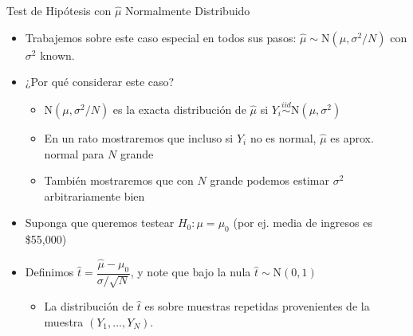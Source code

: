 \documentclass[11pt,handout,aspectratio=169]{beamer}
\begin{document}
\begin{frame}{Test de Hipótesis con $\hat\mu$ Normalmente Distribuido }
\begin{itemize}
	\item 
	Trabajemos sobre este caso especial en todos sus pasos: $\hat\mu \sim \mathrm{N}(\mu, \sigma^2/N)$ con $\sigma^2$ known. 
	\medskip
	\pause
	\item
	¿Por qué considerar este caso?
\smallskip
		\begin{itemize}
			\item 
			$\mathrm{N}(\mu, \sigma^2/N)$ es la exacta distribución de $\hat\mu$ si $Y_i \overset{iid}{\sim} \mathrm{N}(\mu,\sigma^2)$ \pause
			\smallskip
			\item
			En un rato mostraremos que incluso si $Y_i$ no es normal, $\hat\mu$ es aprox. normal para $N$ grande
\smallskip\pause{}
\item También mostraremos que con $N$ grande podemos estimar $\sigma^2$ arbitrariamente bien
		\end{itemize}

	\pause
	\item
	Suponga que queremos testear $H_0:\mu=\mu_0$ (por ej. media de ingresos es \$55,000)
	
	
	\item
	Definimos $\hat{t} = \dfrac{\hat\mu - \mu_0 }{ \sigma /\sqrt{N} }$, y note que bajo la nula $\hat{t} \sim \mathrm{N}(0,1)$ 
	\begin{itemize}
	\pause
	\item
	La distribución de $\hat{t}$ es sobre muestras repetidas provenientes de la muestra  $(Y_1,...,Y_N)$.
		\end{itemize}
\end{itemize}
\end{frame}
\end{document}
